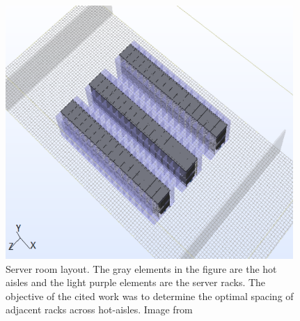 \begin{figure} [!h]
\centering
\includegraphics[scale=.5]{methodology/images/server_room.png}

\caption[Server room layout]{Server room layout. The gray elements in the figure are the hot aisles and the light purple elements are the server racks. The objective of the cited work was to determine the optimal spacing of adjacent racks across hot-aisles.  Image from \cite{sahini16}}
\label{img_server_room}
\end{figure}